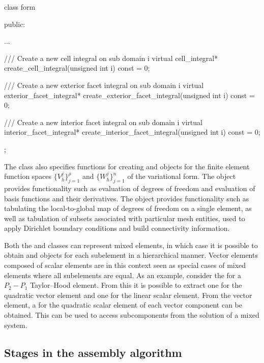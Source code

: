 {\scriptsize
\begin{code}
class form
{
public:

  ...

  /// Create a new cell integral on sub domain i
  virtual cell_integral* create_cell_integral(unsigned int i) const = 0;

  /// Create a new exterior facet integral on sub domain i
  virtual exterior_facet_integral*
  create_exterior_facet_integral(unsigned int i) const = 0;

  /// Create a new interior facet integral on sub domain i
  virtual interior_facet_integral*
  create_interior_facet_integral(unsigned int i) const = 0;

};
\end{code}
}

The  class also specifies functions for creating
 and  objects for the finite
element function spaces $\{V_h^j\}_{j=1}^{\rho}$ and
$\{W_h^j\}_{j=1}^n$ of the variational form.  The
 object provides functionality such as evaluation
of degrees of freedom and evaluation of basis functions and their
derivatives. The  object provides functionality such as
tabulating the local-to-global map of degrees of freedom on a single
element, as well as tabulation of subsets associated with particular
mesh entities, used to apply Dirichlet boundary conditions and build
connectivity information.

Both the  and  classes can
represent mixed elements, in which case it is possible to obtain
 and  objects for each subelement
in a hierarchical manner. Vector elements composed of scalar elements
are in this context seen as special cases of mixed elements where all
subelements are equal. As an example, consider the  for
a $P_2-P_1$ Taylor--Hood element. From this  it is
possible to extract one  for the quadratic vector
element and one  for the linear scalar element. From the
vector element, a  for the quadratic scalar element of
each vector component can be obtained. This can be used to access subcomponents
from the solution of a mixed system.

\subsection{Stages in the assembly algorithm}

